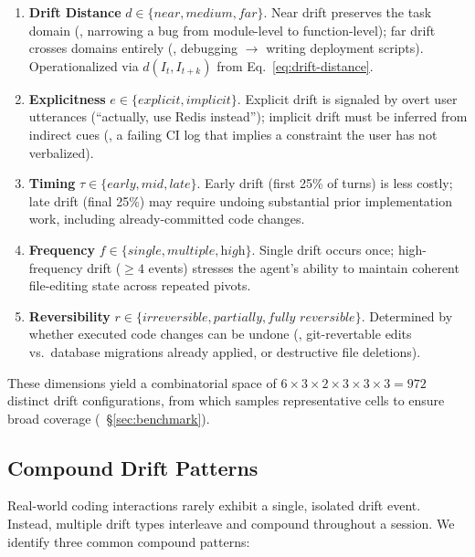 \begin{enumerate}[leftmargin=1.5em,itemsep=2pt]
    \item \textbf{Drift Distance} $d \in \{\textit{near}, \textit{medium}, \textit{far}\}$. Near drift preserves the task domain (\eg, narrowing a bug from module-level to function-level); far drift crosses domains entirely (\eg, debugging $\to$ writing deployment scripts). Operationalized via $d(I_t, I_{t+k})$ from Eq.~\eqref{eq:drift-distance}.
    \item \textbf{Explicitness} $e \in \{\textit{explicit}, \textit{implicit}\}$. Explicit drift is signaled by overt user utterances (``actually, use Redis instead''); implicit drift must be inferred from indirect cues (\eg, a failing CI log that implies a constraint the user has not verbalized).
    \item \textbf{Timing} $\tau \in \{\textit{early}, \textit{mid}, \textit{late}\}$. Early drift (first 25\% of turns) is less costly; late drift (final 25\%) may require undoing substantial prior implementation work, including already-committed code changes.
    \item \textbf{Frequency} $f \in \{\textit{single}, \textit{multiple}, \textit{high}\}$. Single drift occurs once; high-frequency drift ($\geq 4$ events) stresses the agent's ability to maintain coherent file-editing state across repeated pivots.
    \item \textbf{Reversibility} $r \in \{\textit{irreversible}, \textit{partially}, \textit{fully\ reversible}\}$. Determined by whether executed code changes can be undone (\eg, git-revertable edits vs.\ database migrations already applied, or destructive file deletions).
\end{enumerate}

\noindent These dimensions yield a combinatorial space of $6 \times 3 \times 2 \times 3 \times 3 \times 3 = 972$ distinct drift configurations, from which \bench{} samples representative cells to ensure broad coverage (\cf~\S\ref{sec:benchmark}).

\subsection{Compound Drift Patterns}
\label{sec:compound}

Real-world coding interactions rarely exhibit a single, isolated drift event. Instead, multiple drift types interleave and compound throughout a session. We identify three common compound patterns:

